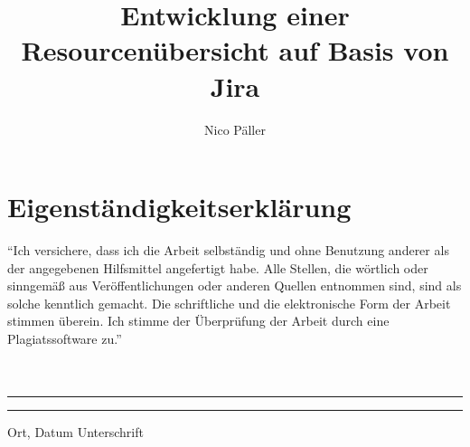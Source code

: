 \documentclass[12pt, a4paper, oneside]{article}
\title{\textbf{Entwicklung einer Resourcenübersicht auf Basis von Jira}}
\author{Nico Päller}
\begin{document}







\printbibliography

\section{Eigenständigkeitserklärung}
``Ich versichere, dass ich die Arbeit selbständig und ohne Benutzung anderer als der angegebenen Hilfsmittel angefertigt habe. Alle Stellen, die wörtlich oder sinngemäß aus Veröffentlichungen oder anderen Quellen entnommen sind, sind als solche kenntlich gemacht. Die schriftliche und die elektronische Form der Arbeit stimmen überein. Ich stimme der Überprüfung der Arbeit durch eine Plagiatssoftware zu.''
\paragraph{}$~~$\\
\paragraph{}$~~$\\
\vspace{50pt} 
\noindent\rule{5cm}{.4pt}\hfill\rule{5cm}{.4pt}\par 
\noindent Ort, Datum \hfill Unterschrift 
\end{document}
